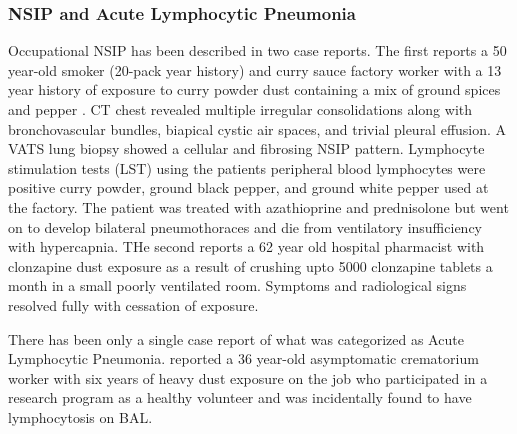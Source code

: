 \documentclass[a4paper,12pt]{article}
\begin{document}
\subsubsection{NSIP and Acute Lymphocytic Pneumonia}
Occupational NSIP has been described in two case reports. The first reports a 50 year-old smoker (20-pack year history) and curry sauce factory worker with a 13 year history of exposure to curry powder dust containing a mix of ground spices and pepper \cite{Ando2006} . CT chest revealed multiple irregular consolidations along with bronchovascular bundles, biapical cystic air spaces, and trivial pleural effusion. A VATS lung biopsy showed a cellular and fibrosing NSIP pattern. Lymphocyte stimulation tests (LST) using the patients peripheral blood lymphocytes were positive curry powder, ground black pepper, and ground white pepper used at the factory. The patient was treated with azathioprine and prednisolone but went on to develop bilateral pneumothoraces and die from ventilatory insufficiency with hypercapnia. THe second reports a 62 year old hospital pharmacist with clonzapine dust exposure as a result of crushing upto 5000 clonzapine tablets a month in a small poorly ventilated room. Symptoms and radiological signs resolved fully with cessation of exposure. \cite{Lewis2012}

There has been only a single case report of what was categorized as Acute Lymphocytic Pneumonia. \cite{Schauble1994} reported a 36 year-old asymptomatic crematorium worker with six years of heavy dust exposure on the job who participated in a research program as a healthy volunteer and was incidentally found to have lymphocytosis on BAL. 
\end{document}
